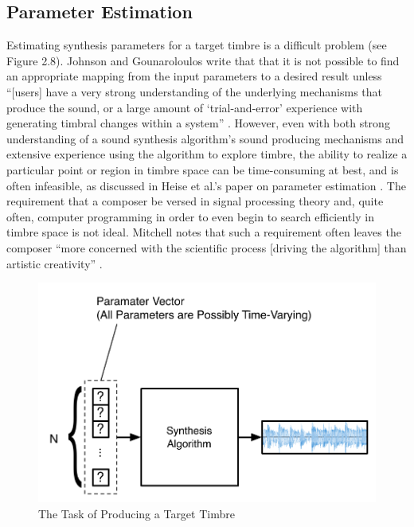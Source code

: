 \documentclass[a4paper,12pt]{report} 	%
\numberwithin{figure}{chapter}
\numberwithin{table}{chapter}
\numberwithin{equation}{chapter}
\begin{document}
\begin{flushleft}
\section{Parameter Estimation}
Estimating synthesis parameters for a target timbre is a difficult problem (see Figure 2.8). Johnson and Gounaroloulos \cite{Johnson:2006pi} write that that it is not possible to find an appropriate mapping from the input parameters to a desired result unless ``[users] have a very strong understanding of the underlying mechanisms that produce the sound, or a large amount of `trial-and-error' experience with generating timbral changes within a system'' \cite[p. 1]{Johnson:2006pi}. However, even with both strong understanding of a sound synthesis algorithm's sound producing mechanisms and extensive experience using the algorithm to explore timbre, the ability to realize a particular point or region in timbre space can be time-consuming at best, and is often infeasible, as discussed in Heise et al.'s paper on parameter estimation \cite[p. 1]{Heise:2009sp}. The requirement that a composer be versed in signal processing theory and, quite often, computer programming in order to even begin to search efficiently in timbre space is not ideal. Mitchell notes that such a requirement often leaves the composer ``more concerned with the scientific process [driving the algorithm] than artistic creativity'' \cite[p. 1]{Mitchell:2007fe}.
\\
\begin{figure}[h!]
\begin{center}
\includegraphics[scale=0.7]{ResynthesisProblem}
\caption[Producing a Target Timbre]{The Task of Producing a Target Timbre}
\end{center}
\end{figure}

\end{flushleft}
\end{document}
